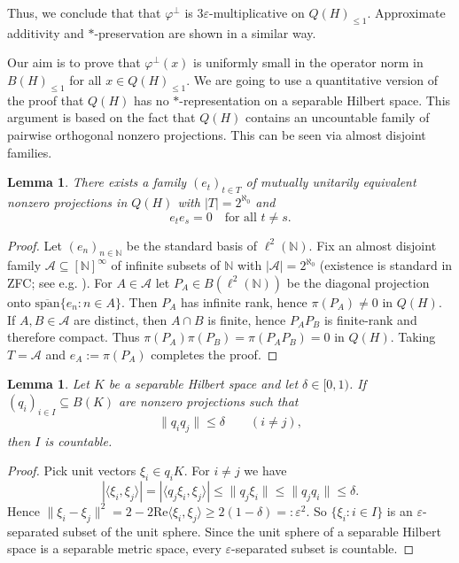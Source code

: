 \documentclass[11pt]{amsproc}
\newcommand{\QH}{Q(H)}
\theoremstyle{definition}
\theoremstyle{plain}
\newtheorem{lemma}[definition]{Lemma}
\theoremstyle{remark}
\begin{document}
Thus, we conclude that that $\varphi^{\perp}$ is $3 \varepsilon$-multiplicative on $\QH_{\le 1}$. Approximate additivity and $*$-preservation are shown in a similar way.

Our aim is to prove that $\varphi^{\perp}(x)$ is uniformly small in the operator norm in $B(H)_{\le 1}$ for all $x \in Q(H)_{\le 1}$. We are going to use a quantitative version of the proof that $\QH$ has no $*$-representation on a separable Hilbert space. This argument is based on the fact that $\QH$ contains an uncountable family of pairwise orthogonal nonzero projections.
This can be seen via almost disjoint families.

\begin{lemma}\label{lem:manyproj}
There exists a family $(e_t)_{t\in T}$ of mutually unitarily equivalent nonzero projections in $\QH$ with $|T|=2^{\aleph_0}$ and
\[e_t e_s=0\quad\text{for all }t\ne s.
\]
\end{lemma}

\begin{proof}
Let $(e_n)_{n\in\mathbb N}$ be the standard basis of $\ell^2(\mathbb N)$.
Fix an almost disjoint family $\mathcal A\subseteq [\mathbb N]^{\infty}$ of infinite subsets of $\mathbb N$ with $|\mathcal A|=2^{\aleph_0}$ (existence is standard in ZFC; see e.g. \cite[Ch.~I, \S2]{FarahAQ}).
For $A\in\mathcal A$ let $P_A\in B(\ell^2(\mathbb N))$ be the diagonal projection onto $\overline{\mathrm{span}}\{e_n:n\in A\}$.
Then $P_A$ has infinite rank, hence $\pi(P_A)\neq 0$ in $\QH$.
If $A,B\in\mathcal A$ are distinct, then $A\cap B$ is finite, hence $P_A P_B$ is finite-rank and therefore compact.
Thus $\pi(P_A)\pi(P_B)=\pi(P_A P_B)=0$ in $\QH$.
Taking $T=\mathcal A$ and $e_A:=\pi(P_A)$ completes the proof.
\end{proof}

\begin{lemma}\label{lem:separated}
Let $K$ be a separable Hilbert space and let $\delta\in[0,1)$.
If $(q_i)_{i\in I}\subseteq B(K)$ are nonzero projections such that
\[\|q_i q_j\|\le \delta\qquad(i\ne j),\]
then $I$ is countable.
\end{lemma}

\begin{proof}
Pick unit vectors $\xi_i\in q_i K$.
For $i\ne j$ we have
\[|\langle \xi_i,\xi_j\rangle|=|\langle q_j\xi_i,\xi_j\rangle|\le \|q_j\xi_i\|\le \|q_j q_i\|\le \delta.
\]
Hence
$\|\xi_i-\xi_j\|^2 = 2-2\mathrm{Re}\langle \xi_i,\xi_j\rangle \ge 2(1-\delta)=:\varepsilon^2.
$
So $\{\xi_i:i\in I\}$ is an $\varepsilon$-separated subset of the unit sphere.
Since the unit sphere of a separable Hilbert space is a separable metric space, every $\varepsilon$-separated subset is countable.
\end{proof}
\end{document}

